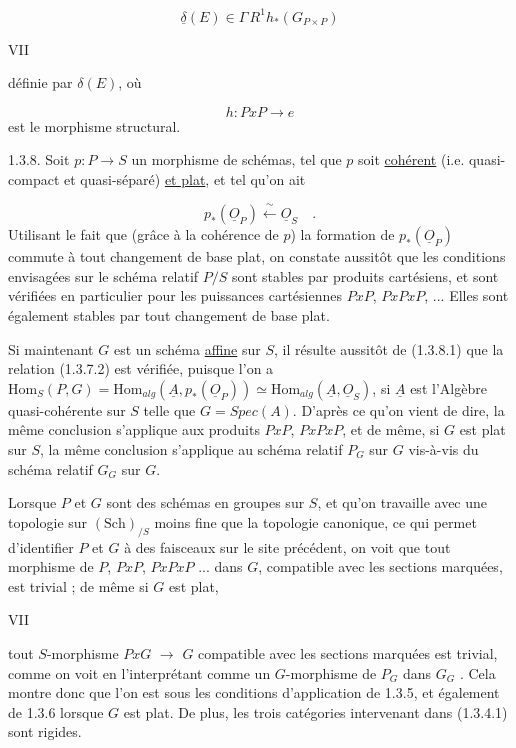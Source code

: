 \begin{equation*}
\underline{\delta}(E) \in \Gamma\, R^1 h_*(G_{P\times P}) 
\end{equation*}



VII

 définie par $\delta(E)$, où

\begin{equation*}
h : PxP \longrightarrow e
\end{equation*}
est le morphisme structural.

1.3.8.  Soit $p : P \longrightarrow S$ un morphisme de schémas, tel que $p$ soit \underline{cohérent} (i.e. quasi-compact et quasi-séparé) \underline{et plat}, et tel qu'on ait

\begin{equation}\tag{1.3.8.1}
p_*(\underline{O}_P) \xleftarrow{\ \sim\ } \underline{O}_S \quad .
\end{equation}
Utilisant le fait que (grâce à la cohérence de $p$) la formation de $p_*(\underline{O}_P)$ commute à tout changement de base plat, on constate aussitôt que les conditions envisagées sur le schéma relatif $P/S$ sont stables par produits cartésiens, et sont vérifiées en particulier pour les puissances cartésiennes $PxP$, $PxPxP$, ... Elles sont également stables par tout changement de base plat.

Si maintenant $G$ est un schéma \underline{affine} sur $S$, il résulte aussitôt de (1.3.8.1) que la relation (1.3.7.2) est vérifiée, puisque l'on a $\mathrm{Hom}_S(P,G) = \mathrm{Hom}_{alg}(\underline{A},p_*(\underline{O}_P)) \simeq \mathrm{Hom}_{alg}(\underline{A},\underline{O}_S)$, si $\underline{A}$ est l'Algèbre quasi-cohérente sur $S$ telle que $G = Spec(A)$. D'après ce qu'on vient de dire, la même conclusion s'applique aux produits $PxP$, $PxPxP$, et de même, si $G$ est plat sur $S$, la même conclusion s'applique au schéma relatif $P_G$ sur $G$ vis-à-vis du schéma relatif $G_G$ sur $G$.

Lorsque $P$ et $G$ sont des schémas en groupes sur $S$, et qu'on travaille avec une topologie sur $(\mathrm{Sch})_{/S}$ moins fine que la topologie canonique, ce qui permet d'identifier $P$ et $G$ à des faisceaux sur le site précédent, on voit que tout morphisme de $P$, $PxP$, $PxPxP$ ... dans $G$, compatible avec les sections marquées, est trivial ; de même si $G$ est plat, 



VII

 tout $S$-morphisme $PxG$ $\longrightarrow$ $G$ compatible avec les sections marquées est trivial, comme on voit en l'interprétant comme un $G$-morphisme de $P_G$ dans $G_G$ . Cela montre donc que l'on est sous les conditions d'application de 1.3.5, et également de 1.3.6 lorsque $G$ est plat. De plus, les trois catégories intervenant dans (1.3.4.1) sont rigides.

